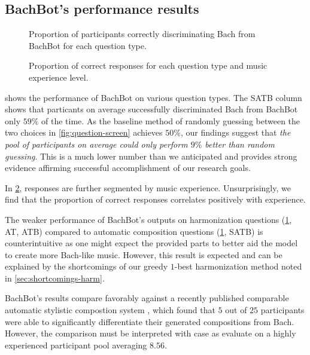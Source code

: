 \subsection{BachBot's performance results}

\begin{figure}[tb]
  \centering
  
  \caption{Proportion of participants correctly discriminating Bach from BachBot for each question type.}
  \label{fig:responses-mask}
\end{figure}

\begin{figure}[tb]
  \centering
  
  \caption{Proportion of correct responses for each question type and music experience level.}
  \label{fig:responses-mask-musicExperience}
\end{figure}

 shows the performance of BachBot on various question
types. The SATB column shows that particants on average successfully
discriminated Bach from BachBot only $59\%$ of the time. As the baseline method
of randomly guessing between the two choices in \cref{fig:question-screen}
achieves $50\%$, our findings suggest that \emph{the pool of participants on
average could only perform $9\%$ better than random guessing}. This is a much
lower number than we anticipated and provides strong evidence affirming successful
accomplishment of our research goals.

In \cref{fig:responses-mask-musicExperience}, responses are further segmented
by music experience. Unsurprisingly, we find that the proportion of correct responses
correlates positively with experience.

The weaker performance of BachBot's outputs on harmonization questions
(\cref{fig:responses-mask}, AT, ATB) compared to automatic composition
questions (\cref{fig:responses-mask}, SATB) is counterintuitive as one might
expect the provided parts to better aid the model to create more Bach-like
music. However, this result is expected and can be explained by the
shortcomings of our greedy $1$-best harmonization method noted in
\vref{sec:shortcomings-harm}.

BachBot's results compare favorably against a recently published comparable
automatic stylistic compostion system \citep{collins2016developing}, which
found that $5$ out of $25$ participants were able to significantly
differentiate their generated compositions from Bach. However, the comparison
must be interpreted with case as \citet{collins2016developing} evaluate on a
highly experienced participant pool averaging $8.56$.

